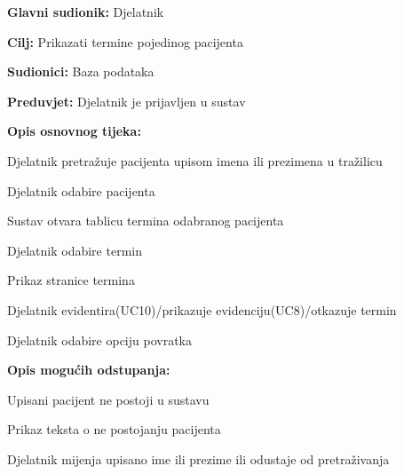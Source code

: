 				\noindent {}
				\begin{packed_item}
					
					\item \textbf{Glavni sudionik: }Djelatnik
					\item  \textbf{Cilj: }Prikazati termine pojedinog pacijenta 
					\item  \textbf{Sudionici: }Baza podataka
					\item  \textbf{Preduvjet: }Djelatnik je prijavljen u sustav
				
					\item  \textbf{Opis osnovnog tijeka: }
					
					\item[] \begin{packed_enum}
						
						\item Djelatnik pretražuje pacijenta upisom imena ili prezimena u tražilicu
						\item Djelatnik odabire pacijenta
						\item Sustav otvara tablicu termina odabranog pacijenta
						\item Djelatnik odabire termin
						\item Prikaz stranice termina
						\item Djelatnik evidentira(UC10)/prikazuje evidenciju(UC8)/otkazuje termin 
						\item Djelatnik odabire opciju povratka
					\end{packed_enum}
					
					\item  \textbf{Opis mogućih odstupanja:}
					
					\item[] \begin{packed_item}
						
						\item[1.a] Upisani pacijent ne postoji u sustavu
						\item[] \begin{packed_enum}
							\item Prikaz teksta o ne postojanju pacijenta
							\item Djelatnik mijenja upisano ime ili prezime ili odustaje od pretraživanja
							
						\end{packed_enum}
						
					\end{packed_item}
					\item[] \begin{packed_item}
						

\end{packed_item}
\end{packed_item}
